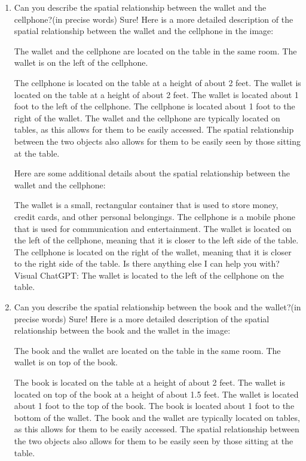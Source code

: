 \begin{enumerate}
    \item Can you describe the spatial relationship between the wallet and the cellphone?(in precise words)
    \subitem 
    Sure! Here is a more detailed description of the spatial relationship between the wallet and the cellphone in the image:
    
    The wallet and the cellphone are located on the table in the same room. The wallet is on the left of the cellphone.
    
    The cellphone is located on the table at a height of about 2 feet.
    The wallet is located on the table at a height of about 2 feet.
    The wallet is located about 1 foot to the left of the cellphone.
    The cellphone is located about 1 foot to the right of the wallet.
    The wallet and the cellphone are typically located on tables, as this allows for them to be easily accessed. The spatial relationship between the two objects also allows for them to be easily seen by those sitting at the table.
    
    Here are some additional details about the spatial relationship between the wallet and the cellphone:
    
    The wallet is a small, rectangular container that is used to store money, credit cards, and other personal belongings.
    The cellphone is a mobile phone that is used for communication and entertainment.
    The wallet is located on the left of the cellphone, meaning that it is closer to the left side of the table.
    The cellphone is located on the right of the wallet, meaning that it is closer to the right side of the table.
    Is there anything else I can help you with?
    \subitem Visual ChatGPT: The wallet is located to the left of the cellphone on the table.
    \item Can you describe the spatial relationship between the book and the wallet?(in precise words)
    \subitem 
    Sure! Here is a more detailed description of the spatial relationship between the book and the wallet in the image:
    
    The book and the wallet are located on the table in the same room. The wallet is on top of the book.
    
    The book is located on the table at a height of about 2 feet.
    The wallet is located on top of the book at a height of about 1.5 feet.
    The wallet is located about 1 foot to the top of the book.
    The book is located about 1 foot to the bottom of the wallet.
    The book and the wallet are typically located on tables, as this allows for them to be easily accessed. The spatial relationship between the two objects also allows for them to be easily seen by those sitting at the table.
    

\end{enumerate}
